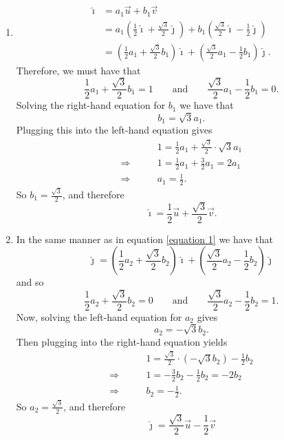 \documentclass[]{ximera}
\begin{document}
\begin{problem}
\begin{freeResponse}
\begin{enumerate}
	\item  
		\begin{align}
		\hat{\imath} &= a_1 \vec{u} + b_1 \vec{v}  \nonumber \\
		&= a_1 \left( \frac{1}{2} \hat{\imath} + \frac{\sqrt{3}}{2} \hat{\jmath} \right) + b_1 \left( \frac{\sqrt{3}}{2} \hat{\imath} - \frac{1}{2} \hat{\jmath} \right)  \nonumber \\
		&= \left( \frac{1}{2} a_1 + \frac{\sqrt{3}}{2} b_1 \right) \hat{\imath} + \left( \frac{\sqrt{3}}{2} a_1 - \frac{1}{2} b_1 \right) \hat{\jmath}.  \label{equation 1}
		\end{align}
	Therefore, we must have that
		\[
		\frac{1}{2} a_1 + \frac{\sqrt{3}}{2} b_1 = 1 	\qquad	\text{and} 	\qquad	\frac{\sqrt{3}}{2} a_1 - \frac{1}{2} b_1 = 0.
		\]
	Solving the right-hand equation for $b_1$ we have that
		\[
		b_1 = \sqrt{3} a_1.
		\]
	Plugging this into the left-hand equation gives
		\begin{align*}
		&1 = \frac{1}{2} a_1 + \frac{\sqrt{3}}{2} \cdot \sqrt{3} a_1  \\
		\Longrightarrow \qquad &1 = \frac{1}{2} a_1 + \frac{3}{2} a_1 = 2 a_1  \\
		\Longrightarrow \qquad &a_1 = \frac{1}{2}.
		\end{align*}
	So $b_1 = \frac{\sqrt{3}}{2}$, and therefore
		\[
		\boxed{\hat{\imath} = \frac{1}{2} \vec{u} + \frac{\sqrt{3}}{2} \vec{v}}.
		\]
	
	
	
	\item  In the same manner as in equation \eqref{equation 1} we have that
		\[
		\hat{\jmath} = \left( \frac{1}{2} a_2 + \frac{\sqrt{3}}{2} b_2 \right) \hat{\imath} + \left( \frac{\sqrt{3}}{2} a_2 - \frac{1}{2} b_2 \right) \hat{\jmath}
		\]
	and so
		\[
		\frac{1}{2} a_2 + \frac{\sqrt{3}}{2} b_2 = 0 	\qquad	\text{and} 	\qquad	\frac{\sqrt{3}}{2} a_2 - \frac{1}{2} b_2 = 1.
		\]
	Now, solving the left-hand equation for $a_2$ gives
		\[
		a_2 = - \sqrt{3} b_2.
		\]
	Then plugging into the right-hand equation yields
		\begin{align*}
		&1 = \frac{\sqrt{3}}{2} \cdot (- \sqrt{3} b_2 ) - \frac{1}{2} b_2  \\
		\Longrightarrow \qquad &1 = - \frac{3}{2} b_2 - \frac{1}{2} b_2 = -2 b_2  \\
		\Longrightarrow \qquad &b_2 = - \frac{1}{2}.
		\end{align*}
	So $a_2 = \frac{\sqrt{3}}{2}$, and therefore
		\[
		\boxed{\hat{\jmath} = \frac{\sqrt{3}}{2} \vec{u} - \frac{1}{2} \vec{v}   }
		\]
	
	\end{enumerate}
	\end{freeResponse}
	
\end{problem}
\end{document}
